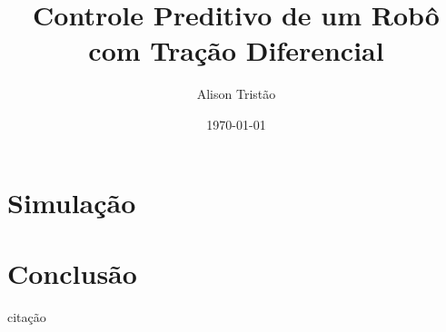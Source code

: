 \documentclass[12pt]{article}
\begin{document}
\justifying

\title{Controle Preditivo de um Robô com Tração Diferencial}
\author{Alison Tristão}
\date{\today}
\maketitle

\tableofcontents
\newpage

\justifying







\section{Simulação}

\section{Conclusão}
citação \cite{vieira2005controle}

\newpage


\end{document}
